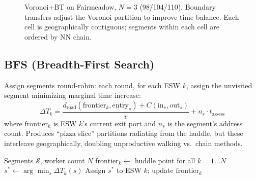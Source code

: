 \documentclass[conference]{IEEEtran}
\begin{document}
\begin{figure}[htbp]
\centering
{}
\caption{Voronoi+BT on Fairmeadow, $N=3$ (98/104/110). Boundary transfers adjust the Voronoi partition to improve time balance. Each cell is geographically contiguous; segments within each cell are ordered by NN chain.}
\end{figure}

\subsection{BFS (Breadth-First Search)}

Assign segments round-robin: each round, for each ESW $k$, assign the unvisited segment minimizing marginal time increase:
\begin{equation}
\Delta T_k = \frac{d_{\text{road}}(\text{frontier}_k, \text{entry}_s) + C(\text{in}_s, \text{out}_s)}{v} + n_s \cdot t_{\text{assess}}
\label{eq:marginal}
\end{equation}
where $\text{frontier}_k$ is ESW $k$'s current exit port and $n_s$ is the segment's address count. Produces ``pizza slice'' partitions radiating from the huddle, but these interleave geographically, doubling unproductive walking vs.\ chain methods.

\begin{algorithm}[htbp]
\caption{BFS}
\begin{algorithmic}[1]
\REQUIRE Segments $\mathcal{S}$, worker count $N$
\STATE $\text{frontier}_k \leftarrow$ huddle point for all $k = 1 \ldots N$
        \STATE $s^* \leftarrow \arg\min_s \Delta T_k(s)$ 
        \STATE Assign $s^*$ to ESW $k$; update $\text{frontier}_k$
    \ENDFOR
\ENDWHILE
\end{algorithmic}
\end{algorithm}
\end{document}
